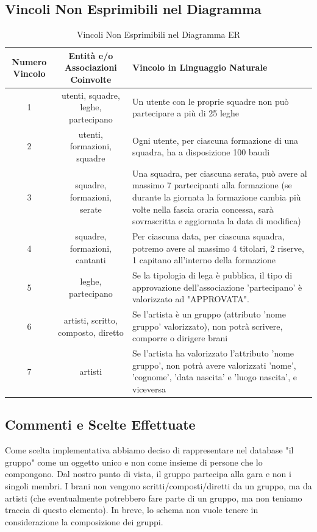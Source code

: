 \documentclass[a4paper,12pt]{article}
\begin{document}
\subsection{Vincoli Non Esprimibili nel Diagramma}
	\begin{table}[h!]
	    \centering
	    \begin{tabular}{|c|c|p{6.5cm}|}
	        \hline
	        \textbf{Numero Vincolo} & \textbf{Entità e/o Associazioni Coinvolte} & \textbf{Vincolo in Linguaggio Naturale} \\ \hline
	        1 & utenti, squadre, leghe, partecipano & Un utente con le proprie squadre non può partecipare a più di 25 leghe \\ \hline
	        2 & utenti, formazioni, squadre & Ogni utente, per ciascuna formazione di una squadra, ha a disposizione 100 baudi \\ \hline
	       	3 & squadre, formazioni, serate & Una squadra, per ciascuna serata, può avere al massimo 7 partecipanti alla formazione (se durante la giornata la formazione cambia più volte nella fascia oraria concessa, sarà sovrascritta e aggiornata la data di modifica) \\ \hline
	        4 & squadre, formazioni, cantanti & Per ciascuna data, per ciascuna squadra, potremo avere al massimo 4 titolari, 2 riserve, 1 capitano all'interno della formazione \\ \hline
	        5 & leghe, partecipano & Se la tipologia di lega è pubblica, il tipo di approvazione dell'associazione 'partecipano' è valorizzato ad "APPROVATA". \\ \hline
	        6 & artisti, scritto, composto, diretto & Se l'artista è un gruppo (attributo 'nome gruppo' valorizzato), non potrà scrivere, comporre o dirigere brani \\ \hline
	        7 & artisti & Se l'artista ha valorizzato l'attributo 'nome gruppo', non potrà avere valorizzati 'nome', 'cognome', 'data nascita' e 'luogo nascita', e viceversa  \\ \hline
	    \end{tabular}
	    \caption{Vincoli Non Esprimibili nel Diagramma ER}
	\end{table}
\subsection{Commenti e Scelte Effettuate}
Come scelta implementativa abbiamo deciso di rappresentare nel database "il gruppo" come un oggetto unico e non come insieme di persone che lo compongono. Dal nostro punto di vista, il gruppo partecipa alla gara e non i singoli membri. I brani non vengono scritti/composti/diretti da un gruppo, ma da artisti (che eventualmente potrebbero fare parte di un gruppo, ma non teniamo traccia di questo elemento). In breve, lo schema non vuole tenere in considerazione la composizione dei gruppi.
\end{document}
